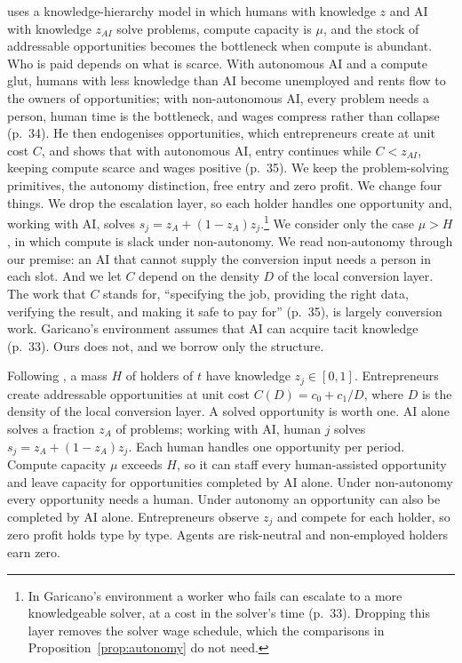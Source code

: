 \documentclass[12pt]{article}
\theoremstyle{remark}
\begin{document}
\citet[pp.~33--35]{garicano2026comment} uses a knowledge-hierarchy model in which humans with knowledge $z$ and AI with knowledge $z_{AI}$ solve problems, compute capacity is $\mu$, and the stock of addressable opportunities becomes the bottleneck when compute is abundant. Who is paid depends on what is scarce. With autonomous AI and a compute glut, humans with less knowledge than AI become unemployed and rents flow to the owners of opportunities; with non-autonomous AI, every problem needs a person, human time is the bottleneck, and wages compress rather than collapse (p.~34). He then endogenises opportunities, which entrepreneurs create at unit cost $C$, and shows that with autonomous AI, entry continues while $C<z_{AI}$, keeping compute scarce and wages positive (p.~35). We keep the problem-solving primitives, the autonomy distinction, free entry and zero profit. We change four things. We drop the escalation layer, so each holder handles one opportunity and, working with AI, solves $s_j=z_A+(1-z_A)z_j$.\footnote{In Garicano's environment a worker who fails can escalate to a more knowledgeable solver, at a cost in the solver's time (p.~33). Dropping this layer removes the solver wage schedule, which the comparisons in Proposition~\ref{prop:autonomy} do not need.} We consider only the case $\mu>H$, in which compute is slack under non-autonomy. We read non-autonomy through our premise: an AI that cannot supply the conversion input needs a person in each slot. And we let $C$ depend on the density $D$ of the local conversion layer. The work that $C$ stands for, ``specifying the job, providing the right data, verifying the result, and making it safe to pay for'' (p.~35), is largely conversion work. Garicano's environment assumes that AI can acquire tacit knowledge (p.~33). Ours does not, and we borrow only the structure.

Following \citet{garicano2026comment}, a mass $H$ of holders of $t$ have knowledge $z_j\in[0,1]$. Entrepreneurs create addressable opportunities at unit cost $C(D)=c_0+c_1/D$, where $D$ is the density of the local conversion layer. A solved opportunity is worth one. AI alone solves a fraction $z_A$ of problems; working with AI, human $j$ solves $s_j=z_A+(1-z_A)z_j$. Each human handles one opportunity per period. Compute capacity $\mu$ exceeds $H$, so it can staff every human-assisted opportunity and leave capacity for opportunities completed by AI alone. Under non-autonomy every opportunity needs a human. Under autonomy an opportunity can also be completed by AI alone. Entrepreneurs observe $z_j$ and compete for each holder, so zero profit holds type by type. Agents are risk-neutral and non-employed holders earn zero.
\end{document}
